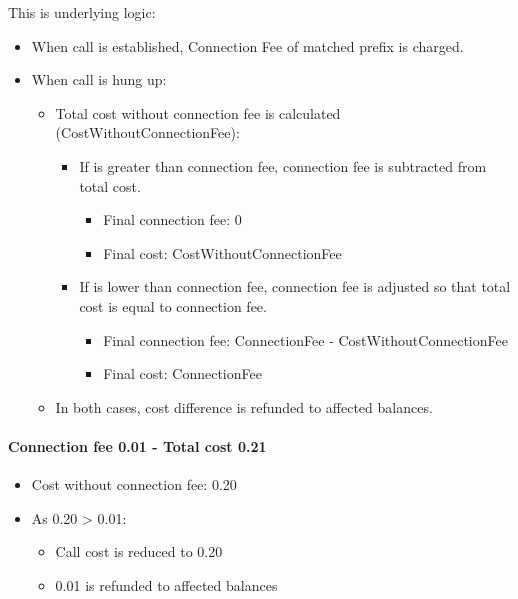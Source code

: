 \documentclass[letterpaper,10pt,english]{sphinxmanual}
\begin{document}
This is underlying logic:
\begin{itemize}
\item {} 
When call is established, Connection Fee of matched prefix is charged.

\item {} 
When call is hung up:
\begin{itemize}
\item {} 
Total cost without connection fee is calculated (CostWithoutConnectionFee):
\begin{itemize}
\item {} 
If is greater than connection fee, connection fee is subtracted from total cost.
\begin{itemize}
\item {} 
Final connection fee: 0

\item {} 
Final cost: CostWithoutConnectionFee

\end{itemize}

\item {} 
If is lower than connection fee, connection fee is adjusted so that total cost is equal to connection fee.
\begin{itemize}
\item {} 
Final connection fee: ConnectionFee - CostWithoutConnectionFee

\item {} 
Final cost: ConnectionFee

\end{itemize}

\end{itemize}

\item {} 
In both cases, cost difference is refunded to affected balances.

\end{itemize}

\end{itemize}
\paragraph{Connection fee 0.01 - Total cost 0.21}
\begin{itemize}
\item {} 
Cost without connection fee: 0.20

\item {} 
As 0.20 \textgreater{} 0.01:
\begin{itemize}
\item {} 
Call cost is reduced to 0.20

\item {} 
0.01 is refunded to affected balances

\end{itemize}

\end{itemize}
\end{document}
